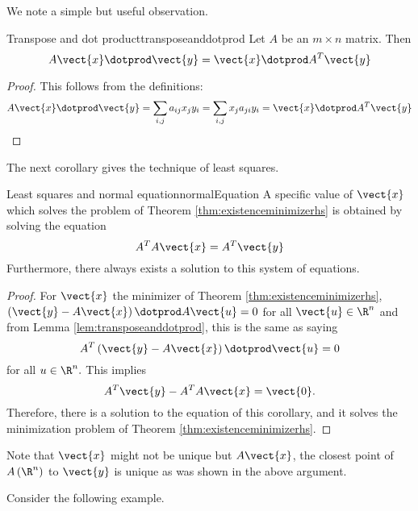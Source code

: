 We note a simple but useful observation.

\begin{lemma}{Transpose and dot product}{transposeanddotprod}
Let $A$ be an $m\times n$ matrix. Then 
\begin{equation*}
A\vect{x} \dotprod \vect{y} = \vect{x}\dotprod A^T\vect{y} 
\end{equation*}
\end{lemma}

\begin{proof}
This follows from the definitions:
\[ A\vect{x} \dotprod \vect{y}=\sum_{i,j}a_{ij}x_{j} y_{i}
=\sum_{i,j}x_{j} a_{ji} y_{i}= \vect{x} \dotprod A^T\vect{y}
\] \end{proof}

The next corollary gives the technique of least squares.

\begin{corollary}{Least squares and normal equation}{normalEquation}
A specific value of $\vect{x}$ which solves the problem of Theorem 
\ref{thm:existenceminimizerhs} is obtained by solving the equation
\begin{equation*}
A^TA\vect{x}=A^T\vect{y}
\end{equation*}
Furthermore, there always exists a solution to this system of equations.
\end{corollary}

\begin{proof} 
For $\vect{x}$ the minimizer of Theorem \ref{thm:existenceminimizerhs}, $\left(
\vect{y}-A\vect{x}\right) \dotprod A \vect{u} =0$ for all $\vect{u} \in \R^{n}$ and from
Lemma \ref{lem:transposeanddotprod}, this is the same as saying
\begin{equation*}
A^T\left( \vect{y}-A\vect{x}\right) \dotprod \vect{u}=0
\end{equation*}
for all $u \in \R^{n}.$ This implies 
\begin{equation*}
A^T\vect{y}-A^TA\vect{x}=\vect{0}.
\end{equation*}
Therefore, there is a solution to the equation of this corollary, and it
solves the minimization problem of Theorem \ref{thm:existenceminimizerhs}.
\end{proof}

Note that $\vect{x}$ might not be unique but $A\vect{x}$, the closest
point of $A\left(\R^{n}\right)$ to $\vect{y}$ is unique as was shown in the
above argument. 

Consider the following example. 

